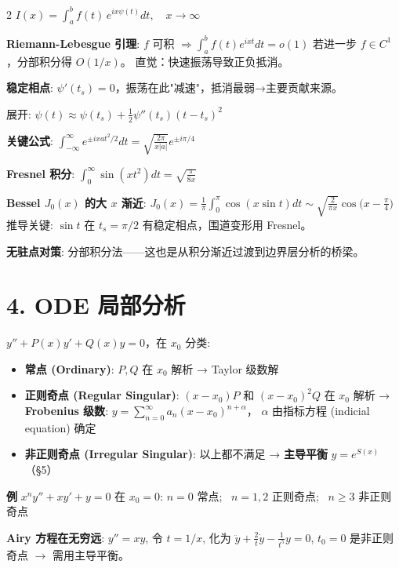 \documentclass[10pt,a4paper]{article}
\begin{document}
\begin{multicols}{2}
$I(x) = \int_a^b f(t)\, e^{ix\psi(t)}dt,\quad x \to \infty$

\textbf{Riemann-Lebesgue 引理}:
$f$ 可积 $\Rightarrow \int_a^b f(t) e^{ixt}dt = o(1)$\;
若进一步 $f \in C^1$，分部积分得 $O(1/x)$。
直觉：快速振荡导致正负抵消。

\textbf{稳定相点}: $\psi'(t_s)=0$，振荡在此"减速"，抵消最弱→主要贡献来源。

展开: $\psi(t) \approx \psi(t_s) + \frac{1}{2}\psi''(t_s)(t-t_s)^2$

\textbf{关键公式}:
$\int_{-\infty}^{\infty} e^{\pm i x a t^2/2}dt = \sqrt{\frac{2\pi}{x|a|}} e^{\pm i\pi/4}$

\textbf{Fresnel 积分}:
$\int_0^\infty \sin(xt^2)dt = \sqrt{\frac{\pi}{8x}}$

\textbf{Bessel $J_0(x)$ 的大 $x$ 渐近}:
$J_0(x) = \frac{1}{\pi}\int_0^\pi \cos(x\sin t)dt \sim \boxed{\sqrt{\frac{2}{\pi x}}\cos\!\bigl(x-\frac{\pi}{4}\bigr)}$
推导关键: $\sin t$ 在 $t_s=\pi/2$ 有稳定相点，围道变形用 Fresnel。

\textbf{无驻点对策}: 分部积分法——这也是从积分渐近过渡到边界层分析的桥梁。


\section{4. ODE 局部分析}

$y'' + P(x)y' + Q(x)y = 0$，在 $x_0$ 分类:

\begin{itemize}
\item \textbf{常点 (Ordinary)}: $P,Q$ 在 $x_0$ 解析 → Taylor 级数解
\item \textbf{正则奇点 (Regular Singular)}: $(x-x_0)P$ 和 $(x-x_0)^2 Q$ 在 $x_0$ 解析
  → \textbf{Frobenius 级数}: $y = \sum_{n=0}^{\infty} a_n (x-x_0)^{n+\alpha}$，
  $\alpha$ 由指标方程 (indicial equation) 确定
\item \textbf{非正则奇点 (Irregular Singular)}: 以上都不满足
  → \textbf{主导平衡} $y = e^{S(x)}$（§5）
\end{itemize}

\textbf{例} $x^n y'' + xy' + y = 0$ 在 $x_0=0$:
$n=0$ 常点; \ $n=1,2$ 正则奇点; \ $n \ge 3$ 非正则奇点

\textbf{Airy 方程在无穷远}: $y'' = xy$, 令 $t = 1/x$,
化为 $\ddot{y} + \frac{2}{t}\dot{y} - \frac{1}{t^5}y = 0$,
$t_0=0$ 是非正则奇点 $\rightarrow$ 需用主导平衡。



\end{multicols}
\end{document}
